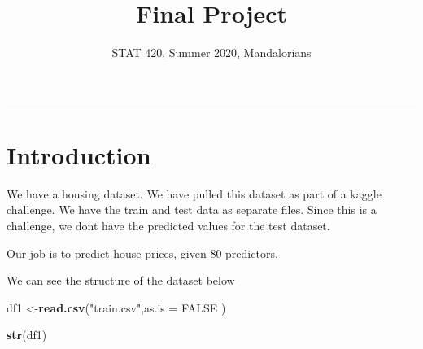 \documentclass[
]{article}
\title{Final Project}
\author{STAT 420, Summer 2020, Mandalorians}
\date{}
\newenvironment{Shaded}{\begin{snugshade}}{\end{snugshade}}
\newcommand{\DataTypeTok}[1]{\textcolor[rgb]{0.13,0.29,0.53}{#1}}
\newcommand{\KeywordTok}[1]{\textcolor[rgb]{0.13,0.29,0.53}{\textbf{#1}}}
\newcommand{\NormalTok}[1]{#1}
\newcommand{\OtherTok}[1]{\textcolor[rgb]{0.56,0.35,0.01}{#1}}
\newcommand{\StringTok}[1]{\textcolor[rgb]{0.31,0.60,0.02}{#1}}
\begin{document}
\maketitle

{
\hypersetup{linkcolor=}
\setcounter{tocdepth}{2}
\tableofcontents
}

\begin{center}\rule{0.5\linewidth}{0.5pt}\end{center}

\hypertarget{introduction}{%
\section{Introduction}\label{introduction}}

We have a housing dataset. We have pulled this dataset as part of a kaggle challenge. We have the train and test data as separate files. Since this is a challenge, we dont have the predicted values for the test dataset.

Our job is to predict house prices, given 80 predictors.

We can see the structure of the dataset below

\begin{Shaded}
\begin{Highlighting}[]
\NormalTok{df1 <-}\KeywordTok{read.csv}\NormalTok{(}\StringTok{"train.csv"}\NormalTok{,}\DataTypeTok{as.is =} \OtherTok{FALSE}\NormalTok{ )}

\KeywordTok{str}\NormalTok{(df1)}
\end{Highlighting}
\end{Shaded}
\end{document}
